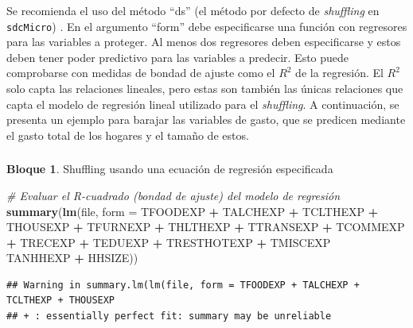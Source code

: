 \documentclass[]{book}
\newenvironment{Shaded}{\begin{snugshade}}{\end{snugshade}}
\newcommand{\CommentTok}[1]{\textcolor[rgb]{0.56,0.35,0.01}{\textit{#1}}}
\newcommand{\DataTypeTok}[1]{\textcolor[rgb]{0.13,0.29,0.53}{#1}}
\newcommand{\KeywordTok}[1]{\textcolor[rgb]{0.13,0.29,0.53}{\textbf{#1}}}
\newcommand{\NormalTok}[1]{#1}
\newcommand{\OperatorTok}[1]{\textcolor[rgb]{0.81,0.36,0.00}{\textbf{#1}}}
\newcommand{\StringTok}[1]{\textcolor[rgb]{0.31,0.60,0.02}{#1}}
\theoremstyle{definition}
\theoremstyle{definition}
\newtheorem{example}{Bloque}[chapter]
\theoremstyle{definition}
\theoremstyle{definition}
\theoremstyle{remark}
\begin{document}
Se recomienda el uso del método ``ds'' (el método por defecto de \emph{shuffling} en \texttt{sdcMicro}) \citep{TeMK14}. En el argumento ``form'' debe especificarse una función con regresores para las variables a proteger. Al menos dos regresores deben especificarse y estos deben tener poder predictivo para las variables a predecir. Esto puede comprobarse con medidas de bondad de ajuste como el \(R^2\) de la regresión. El \(R^2\) solo capta las relaciones lineales, pero estas son también las únicas relaciones que capta el modelo de regresión lineal utilizado para el \emph{shuffling}. A continuación, se presenta un ejemplo para barajar las variables de gasto, que se predicen mediante el gasto total de los hogares y el tamaño de estos.

\hypertarget{section-12}{%
\subsubsection{}\label{section-12}}

\begin{example}
\protect\hypertarget{exm:bloque38jgm}{}{\label{exm:bloque38jgm} }Shuffling usando una ecuación de regresión especificada
\end{example}

\begin{Shaded}
\begin{Highlighting}[]
\CommentTok{# Evaluar el R-cuadrado (bondad de ajuste) del modelo de regresión}
\KeywordTok{summary}\NormalTok{(}\KeywordTok{lm}\NormalTok{(file, }\DataTypeTok{form =}\NormalTok{ TFOODEXP }\OperatorTok{+}\StringTok{ }\NormalTok{TALCHEXP }\OperatorTok{+}\StringTok{ }\NormalTok{TCLTHEXP }\OperatorTok{+}\StringTok{ }\NormalTok{THOUSEXP }\OperatorTok{+}\StringTok{ }\NormalTok{TFURNEXP }\OperatorTok{+}\StringTok{ }\NormalTok{THLTHEXP }\OperatorTok{+}\StringTok{ }\NormalTok{TTRANSEXP }\OperatorTok{+}\StringTok{ }\NormalTok{TCOMMEXP }\OperatorTok{+}\StringTok{ }\NormalTok{TRECEXP }\OperatorTok{+}\StringTok{ }\NormalTok{TEDUEXP }\OperatorTok{+}\StringTok{ }\NormalTok{TRESTHOTEXP }\OperatorTok{+}\StringTok{ }\NormalTok{TMISCEXP }\OperatorTok{~}\StringTok{ }\NormalTok{TANHHEXP }\OperatorTok{+}\StringTok{ }\NormalTok{HHSIZE)) }
\end{Highlighting}
\end{Shaded}

\begin{verbatim}
## Warning in summary.lm(lm(file, form = TFOODEXP + TALCHEXP + TCLTHEXP + THOUSEXP
## + : essentially perfect fit: summary may be unreliable
\end{verbatim}
\end{document}

